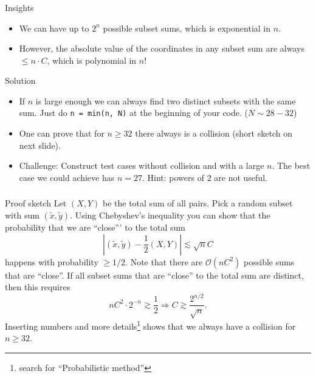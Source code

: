 \begin{frame}
    \frametitle{\problemtitle}
    \begin{block}{Insights}
        \begin{itemize}
            \item We can have up to $2^n$ possible subset sums, which is exponential in $n$. \pause
            \item However, the absolute value of the coordinates in any subset sum are always $\leq n \cdot C$, which is polynomial in $n$!
        \end{itemize}
    \end{block}
    \pause
    \begin{block}{Solution}
        \begin{itemize}
            \item<+-> If $n$ is large enough we can always find two distinct subsets with the same sum. Just do \texttt{n = min(n, N)} at the beginning of your code. ($N \sim 28-32$)
            \item<+-> One can prove that for $n \geq 32$ there always is a collision (short sketch on next slide).
            \item<+-> Challenge: Construct test cases without collision and with a large $n$. The best case we could achieve has $n = 27$. Hint: powers of $2$ are not useful.        
        \end{itemize}
    \end{block}
\end{frame}
\begin{frame}
    \frametitle{\problemtitle}
    \begin{block}{Proof sketch}
    Let $(X, Y)$ be the total sum of all pairs. Pick a random subset with sum $(\tilde{x},\tilde{y})$. Using Chebyshev's inequality you can show that the probability that we are ``close''' to the total sum $$\left|(\tilde{x},\tilde{y}) - \frac{1}{2}(X, Y)\right| \lesssim \sqrt{n} C$$ happens with probability $\geq 1/2$. Note that there are $\mathcal{O}(nC^2)$ possible sums that are ``close''. If all subset sums that are ``close'' to the total sum are distinct, then this requires $$nC^2\cdot 2^{-n} \gtrsim \frac{1}{2} \Rightarrow C \gtrsim \frac{2^{n/2}}{\sqrt{n}}.$$ Inserting numbers and more details\footnote{search for ``Probabilistic method''} shows that we always have a collision for $n \geq 32$.
    \end{block}
\end{frame}
